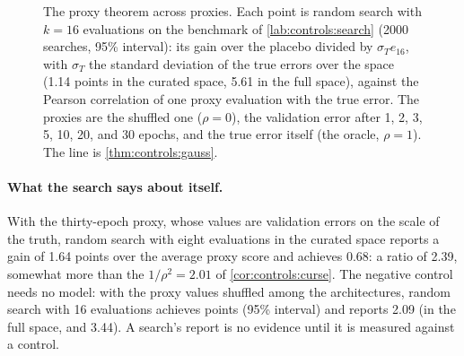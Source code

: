 \begin{refsection}
\begin{figure}[t]
\centering
{}
\caption{The proxy theorem across proxies. Each point is random search with $k=16$ evaluations on the benchmark of \cref{lab:controls:search} (2000 searches, 95\% interval): its gain over the placebo divided by $\sigma_Te_{16}$, with $\sigma_T$ the standard deviation of the true errors over the space (1.14 points in the curated space, 5.61 in the full space), against the Pearson correlation of one proxy evaluation with the true error. The proxies are the shuffled one ($\rho=0$), the validation error after 1, 2, 3, 5, 10, 20, and 30 epochs, and the true error itself (the oracle, $\rho=1$). The line is \cref{thm:controls:gauss}.}\label{fig:controls:gain}
\end{figure}

\paragraph{What the search says about itself.} With the thirty-epoch proxy, whose values are validation errors on the scale of the truth, random search with eight evaluations in the curated space reports a gain of 1.64 points over the average proxy score and achieves 0.68: a ratio of 2.39, somewhat more than the $1/\rho^2=2.01$ of \cref{cor:controls:curse}. The negative control needs no model: with the proxy values shuffled among the architectures, random search with 16 evaluations achieves  points (95\% interval) and reports 2.09 (in the full space,  and 3.44). A search's report is no evidence until it is measured against a control.


\end{refsection}
